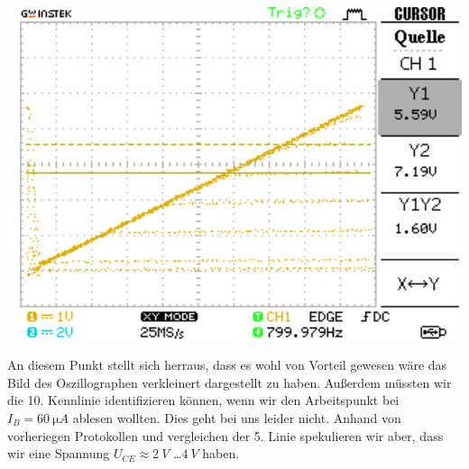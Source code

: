 \documentclass[10pt]{article}
\newenvironment{Figure}
  {\par\medskip\noindent\minipage{\linewidth}}
  {\endminipage\par\medskip}
\begin{document}
\begin{multicols}{2}
	\begin{Figure}
		\centering\includegraphics[width=1\textwidth]{../data/Kennlinie4_npn.png}
		\label{fig:1.6}
	\end{Figure}
	An diesem Punkt stellt sich herraus, dass es wohl von Vorteil gewesen wäre das Bild des Oszillographen verkleinert dargestellt zu haben. Außerdem müssten wir die 10. Kennlinie identifizieren können, wenn wir den Arbeitspunkt bei $I_B = \SI{60}{\micro A}$ ablesen wollten. Dies geht bei uns leider nicht. Anhand von vorheriegen Protokollen und vergleichen der 5. Linie spekulieren wir aber, dass wir eine Spannung $U_{CE} \approx \SI{2}{V}$ \dots $\SI{4}{V}$ haben.


\end{multicols}
\end{document}
